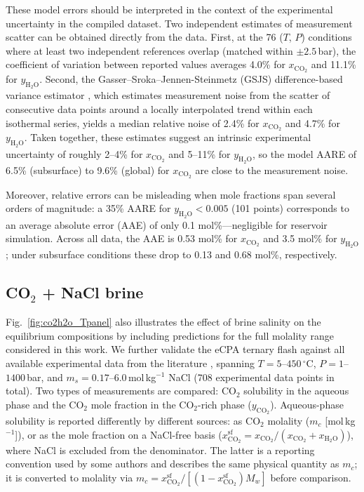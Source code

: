 \documentclass[preprint,12pt,authoryear]{elsarticle}
\begin{document}
These model errors should be interpreted in the context of the experimental
uncertainty in the compiled dataset.
Two independent estimates of measurement scatter can be obtained directly from the data.
First, at the 76 ($T$, $P$) conditions where at least two independent references overlap
(matched within $\pm 2.5$\,bar), the coefficient of variation between reported values
averages 4.0\% for $x_{\text{CO}_2}$ and 11.1\% for $y_{\text{H}_2\text{O}}$.
Second, the Gasser--Sroka--Jennen-Steinmetz (GSJS) difference-based variance
estimator \citep{Gasser1986}, which estimates measurement noise from the
scatter of consecutive data points around a locally interpolated trend within each
isothermal series, yields a median relative noise of 2.4\% for $x_{\text{CO}_2}$ and
4.7\% for $y_{\text{H}_2\text{O}}$.
Taken together, these estimates suggest an intrinsic experimental uncertainty
of roughly 2--4\% for $x_{\text{CO}_2}$ and 5--11\% for $y_{\text{H}_2\text{O}}$,
so the model AARE of 6.5\% (subsurface) to 9.6\% (global) for $x_{\text{CO}_2}$
are close to the measurement noise.

Moreover, relative errors can be misleading when mole fractions span several orders of
magnitude: a 35\% AARE for $y_{\text{H}_2\text{O}} < 0.005$ (101 points) corresponds to an
average absolute error (AAE) of only 0.1 mol\%---negligible for reservoir
simulation.  Across all data, the AAE is 0.53 mol\% for $x_{\text{CO}_2}$ and
3.5 mol\% for $y_{\text{H}_2\text{O}}$; under subsurface conditions these drop to
0.13 and 0.68 mol\%, respectively.





\subsection{CO$_2$ + NaCl brine}
\label{sec:co2nacl}

Fig.~\ref{fig:co2h2o_Tpanel} also illustrates the effect of brine salinity on the equilibrium compositions by including predictions for the full molality range considered in this work. 
We further validate the eCPA ternary flash against all available experimental data from the
literature \citep{Guo2015, Rumpf1994, Koschel2006, Kiepe2002, Takenouchi1965,
Chabab2020, Messabeb2016, Hou2013, Yan2011, Zhao2015,
Bando2003, Nighswander1989, Liu2021, Liu2011b, Savary2012},
spanning $T = 5$--$450\,^\circ$C, $P = 1$--$1400$\,bar, and
$m_s = 0.17$--$6.0$\,mol\,kg$^{-1}$ NaCl (708 experimental data points in total).
Two types of measurements are compared: CO$_2$ solubility in the aqueous
phase and the CO$_2$ mole fraction in the CO$_2$-rich phase
($y_{\text{CO}_2}$).
Aqueous-phase solubility is reported differently by different sources:
as CO$_2$ molality ($m_c$ [mol\,kg$^{-1}$]), or as the mole fraction
on a NaCl-free basis
($x_{\text{CO}_2}^{\text{sf}} = x_{\text{CO}_2}/(x_{\text{CO}_2}+x_{\text{H}_2\text{O}})$),
where NaCl is excluded from the denominator.
The latter is a reporting convention used by some authors and describes
the same physical quantity as $m_c$; it is converted to molality via
$m_c = x_{\text{CO}_2}^{\text{sf}}/[(1-x_{\text{CO}_2}^{\text{sf}})M_w]$
before comparison.
\end{document}
